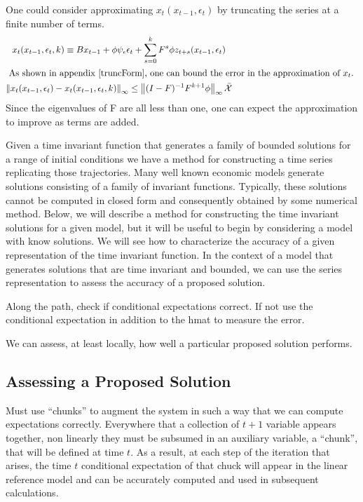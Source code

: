\documentclass[12pt]{article}
\begin{document}
One could consider approximating $x_t(x_{t-1},\epsilon_t)$ by 
truncating the series at a finite number of terms.
 	 \begin{gather}
 	 x_{t}(x_{t-1},\epsilon_t,k) \equiv B x_{t-1}+ \phi \psi_\epsilon\epsilon_t + \sum_{s=0}^k F^s \phi z_{t+s}(x_{t-1},\epsilon_t)  \label{theTruncSeries}\\ %
\intertext{
 As shown in appendix \refeq{truncForm}, one can bound the error in the 
approximation of $x_t$.
}
 	\infNorm{x_{t}(x_{t-1},\epsilon_t) -x_{t}(x_{t-1},\epsilon_t,k)} \le 
  \infNorm{ (I -F)^{-1} F^{k+1}\phi} \bar{\mathcal{X}}
 \end{gather}
Since the eigenvalues of F are all less than one, one can expect the approximation to improve as terms are added.


Given a time invariant function that generates a family of bounded solutions for a range of initial conditions we have a method for constructing a time series
replicating those trajectories.  
Many well known economic models generate solutions consisting of
a family of invariant functions.
Typically, these solutions cannot be computed in closed form and consequently
obtained by some numerical method.
Below, we will describe a method for constructing the time invariant solutions
for a given model, but 
it will be useful to begin by considering a model with know solutions.
We will see how to characterize the accuracy of a given representation of the time invariant function.  In the context of a model that generates
solutions that are time invariant and bounded, we can use the 
series representation to  assess the accuracy of a proposed solution.

Along the path, check if conditional expectations correct.  If not use the conditional expectation in addition to the hmat to measure the error.

We can assess, at least locally, 
how well a particular proposed solution performs.

\subsection{Assessing a Proposed Solution}
\label{sec:decis-rule-assessm}

Must use ``chunks'' to augment the system in such a way that we
can compute expectations correctly.
Everywhere that a collection of 
$t+1$ variable appears together, non linearly they must be subsumed in an
auxiliary variable, a ``chunk'', 
that will be defined at time $t$.  As a result, at each step
of the iteration that arises, the time $t$
conditional expectation of that chuck will appear in the 
linear reference model and can be accurately computed and
used in subsequent calculations.
\end{document}
